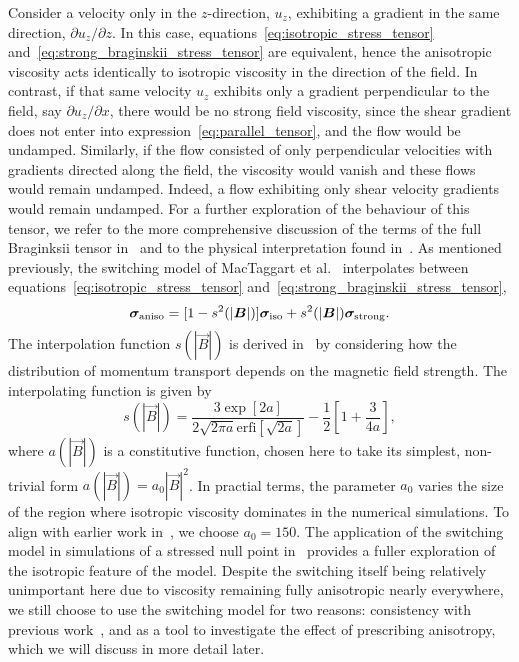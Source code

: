     Consider a velocity only in the $z$-direction, $u_z$, exhibiting a gradient in the same direction, $\partial u_z / \partial z$. In this case, equations~\eqref{eq:isotropic_stress_tensor} and~\eqref{eq:strong_braginskii_stress_tensor} are equivalent, hence the anisotropic viscosity acts identically to isotropic viscosity in the direction of the field. In contrast, if that same velocity $u_z$ exhibits only a gradient perpendicular to the field, say $\partial u_z / \partial x$, there would be no strong field viscosity, since the shear gradient does not enter into expression~\eqref{eq:parallel_tensor}, and the flow would be undamped. Similarly, if the flow consisted of only perpendicular velocities with gradients directed along the field, the viscosity would vanish and these flows would remain undamped. Indeed, a flow exhibiting only shear velocity gradients would remain undamped. For a further exploration of the behaviour of this tensor, we refer to the more comprehensive discussion of the terms of the full Braginksii tensor in~\cite{braginskiiTransportProcessesPlasma1965} and to the physical interpretation found in~\cite{hollwegViscosityMagnetizedPlasma1985}.
As mentioned previously, the switching model of MacTaggart et al.~\cite{mactaggartBraginskiiMagnetohydrodynamicsArbitrary2017} interpolates between equations~\eqref{eq:isotropic_stress_tensor} and~\eqref{eq:strong_braginskii_stress_tensor},
\begin{equation}
{\bm \sigma}_{\text{aniso}} = [1 - s^2(|{\bm B}|)]{\bm \sigma}_{\text{iso}} + s^2(|{\bm B}|){\bm \sigma}_{\text{strong}}.
\label{eq:switching_stress_tensor}
\end{equation}
The interpolation function $s(|\vec{B}|)$ is derived in~\cite{mactaggartBraginskiiMagnetohydrodynamicsArbitrary2017} by considering how the distribution of momentum transport depends on the magnetic field strength. The interpolating function is given by
\begin{equation}
s(|\vec{B}|) = \frac{3 \exp[2a]}{2\sqrt{2\pi a} \text{erfi}[\sqrt{2a}]} - \frac{1}{2}\left[ 1 + \frac{3}{4a} \right],
\label{eq:s-function}
\end{equation}
where $a(|\vec{B}|)$ is a constitutive function, chosen here to take its simplest, non-trivial form $a(|\vec{B}|) = a_0 |\vec{B}|^2$. In practial terms, the parameter $a_0$ varies the size of the region where isotropic viscosity dominates in the numerical simulations. To align with earlier work in~\cite{mactaggartBraginskiiMagnetohydrodynamicsArbitrary2017}, we choose $a_0 = 150$. The application of the switching model in simulations of a stressed null point in~\cite{mactaggartBraginskiiMagnetohydrodynamicsArbitrary2017} provides a fuller exploration of the isotropic feature of the model. Despite the switching itself being relatively unimportant here due to viscosity remaining fully anisotropic nearly everywhere, we still choose to use the switching model for two reasons: consistency with previous work~\cite{mactaggartBraginskiiMagnetohydrodynamicsArbitrary2017}, and as a tool to investigate the effect of prescribing anisotropy, which we will discuss in more detail later.


